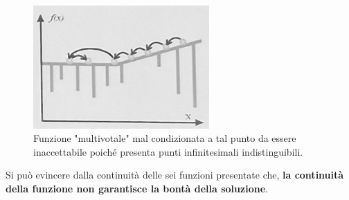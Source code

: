 \begin{figure}[h!]
    \centering 
    \includegraphics[width=0.6\textwidth]{Esterni/Altro/imgs/t6.jpg} 
    \caption{ Funzione "multivotale" mal condizionata a tal punto da essere inaccettabile poiché presenta punti infinitesimali indistinguibili.} 
    \label{fig:type6} 
\end{figure}

\newpage
\begin{notion}
    Si può evincere dalla continuità delle sei funzioni presentate che, \textbf{la continuità della funzione non garantisce la bontà della soluzione}.
\end{notion}